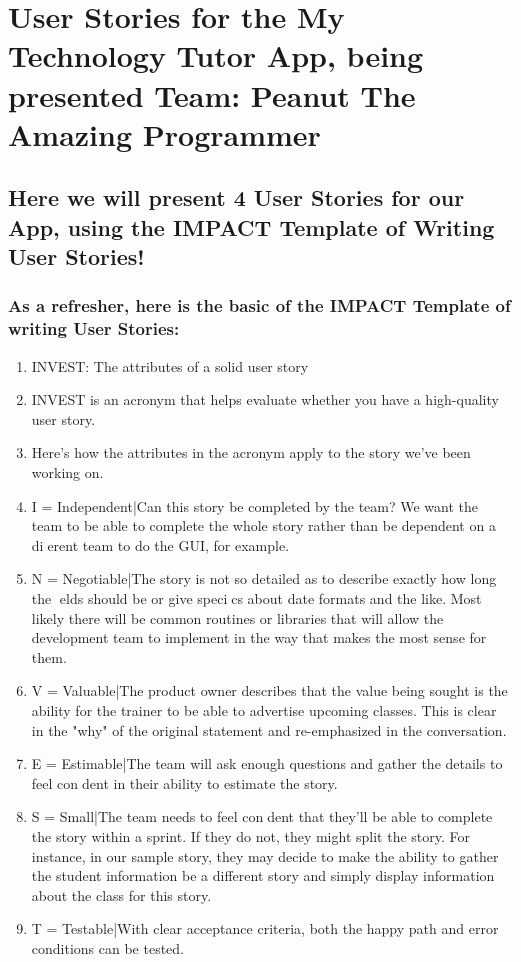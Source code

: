 \section{User Stories for the My Technology Tutor App, being presented Team: Peanut The Amazing Programmer}

\subsection{Here we will present 4 User Stories for our App, using the IMPACT Template of Writing User Stories!}
\subsubsection{As a refresher, here is the basic of the IMPACT Template of writing User Stories:}
\begin{enumerate}
\item INVEST: The attributes of a solid user story
\item INVEST is an acronym that helps evaluate whether you have a high-quality user story.
\item Here's how the attributes in the acronym apply to the story we've been working on.
\item I = Independent|Can this story be completed by the team? We want the team to
be able to complete the whole story rather than be dependent on a dierent team to
do the GUI, for example.
\item N = Negotiable|The story is not so detailed as to describe exactly how long the elds
should be or give specics about date formats and the like. Most likely there will be
common routines or libraries that will allow the development team to implement in
the way that makes the most sense for them.
\item V = Valuable|The product owner describes that the value being sought is the ability
for the trainer to be able to advertise upcoming classes. This is clear in the "why" of
the original statement and re-emphasized in the conversation.
\item E = Estimable|The team will ask enough questions and gather the details to feel
condent in their ability to estimate the story.
\item S = Small|The team needs to feel condent that they'll be able to complete the
story within a sprint. If they do not, they might split the story. For instance, in our
sample story, they may decide to make the ability to gather the student information
be a different story and simply display information about the class for this story.
\item T = Testable|With clear acceptance criteria, both the happy path and error conditions can be tested.
\end{enumerate}

